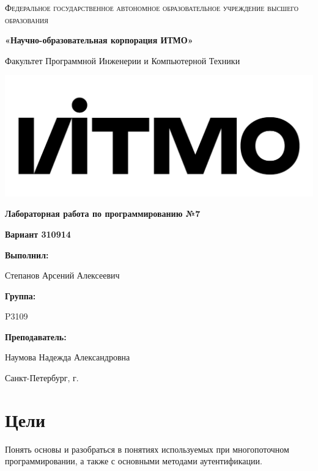 \documentclass[12pt,a4paper]{report}
\begin{document}
\begin{titlepage} 
	\centering
	{
        \scshape
        Федеральное государственное автономное образовательное учреждение высшего образования
        \par
        \textbf{«Научно-образовательная корпорация ИТМО»}
        \par
        \vspace*{1cm}
        Факультет Программной Инженерии и Компьютерной Техники
        \par
    }
    \vspace*{0.6cm}
    \includegraphics[width=\textwidth]{logo.png}
    {
        \Large
        \textbf{Лабораторная работа по программированию №7}
        \par
        \normalsize
        \vspace*{0.75cm}
        \textbf{Вариант 310914}
        \par
    }
    \vfill
    \hfill\begin{minipage}{\dimexpr\textwidth-7.8cm}
        \textbf{Выполнил:}\par
        Степанов Арсений Алексеевич\par
        \vspace*{0.15cm}
        \textbf{Группа:}\par
        P3109\par
        \vspace*{0.15cm}
        \textbf{Преподаватель:}\par
        Наумова Надежда Александровна\par
    \end{minipage}
    \vfill
    Санкт-Петербург, \the\year{}г.
\end{titlepage}  
\section*{Цели}
Понять основы и разобраться в понятиях используемых при многопоточном программировании,
а также с основными методами аутентификации.
\end{document}
